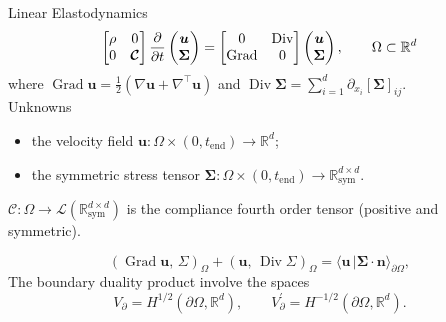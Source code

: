 \documentclass[aspectratio=169]{beamer}
\DeclareMathOperator*{\Grad}{Grad}
\DeclareMathOperator*{\Div}{Div}
\newcommand{\bbR}{\mathbb{R}}
\newcommand{\inner}[3][]{\ensuremath{( #2, \, #3 )_{#1}}}
\newcommand{\dualpr}[3][]{\ensuremath{\langle #2 \, \vert #3 \rangle_{#1}}}
\begin{document}
\begin{frame}{Linear Elastodynamics}
	\begin{equation*}
		\begin{bmatrix}
			\rho & 0 \\
			0 & \bm{\mathcal{C}}
		\end{bmatrix}\diffp{}{t}\begin{pmatrix}
			\bm{u} \\ \bm{\Sigma} 
		\end{pmatrix} = 
		\begin{bmatrix}
			0 & \Div \\
			\Grad & 0 \\
		\end{bmatrix}\begin{pmatrix}
			\bm{u} \\ \bm{\Sigma}
		\end{pmatrix}, \qquad \Omega \subset \bbR^d
	\end{equation*}
where $\Grad\bm{u}=\frac{1}{2}(\nabla \bm{u} + \nabla^\top \bm{u})$ and $\Div \bm{\Sigma}= \sum_{i=1}^d \partial_{x_i} [\bm\Sigma]_{ij}$.\\

	Unknowns 
	\begin{itemize}
		\item the velocity field $\bm{u} : \Omega \times (0, t_{\mathrm{end}}) \rightarrow \bbR^d$;
		\item the symmetric stress tensor $\bm{\Sigma} : \Omega \times (0, t_{\mathrm{end}}) \rightarrow \bbR^{d\times d}_{\text{sym}}$.
	\end{itemize}
	 $\bm{\mathcal{C}}: \Omega \rightarrow \mathcal{L}(\bbR^{d\times d}_{\text{sym}})$ is the compliance fourth order tensor (positive and symmetric). 
	 
	\begin{equation*}
		\inner[\Omega]{\Grad \bm{u}}{\Sigma} + \inner[\Omega]{\bm{u}}{\Div \Sigma} = \dualpr[\partial\Omega]{\bm{u}}{\bm{\Sigma} \cdot \bm{n}},
	\end{equation*}
	The boundary duality product involve the spaces
	\begin{equation*}
			V_\partial = H^{1/2}(\partial\Omega, \bbR^d), \qquad  V_\partial^{'} = H^{-1/2}(\partial\Omega, \bbR^d).
	\end{equation*}
\end{frame}
\end{document}
